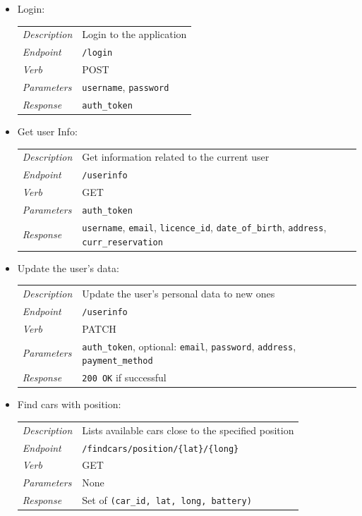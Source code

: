 \documentclass[english]{article}
\newcommand{\code}[1]{\texttt{#1}}
\begin{document}
\begin{itemize}
\begin{itemize}
	\item{Login:}\\
	\begin{tabular}{ | l l }
		\textit{Description} & Login to the application \\
		\textit{Endpoint} & \code{/login} \\ 
		\textit{Verb} & POST \\  
		\textit{Parameters} & \code{username}, \code{password} \\
		\textit{Response} & \code{auth\_token}
	\end{tabular}
	
	\item{Get user Info:}\\
		\begin{tabular}{ | l l }
			\textit{Description} & Get information related to the current user\\
			\textit{Endpoint} & \code{/userinfo} \\ 
			\textit{Verb} & GET \\  
			\textit{Parameters} & \code{auth\_token} \\
			\textit{Response} & \code{username}, \code{email}, \code{licence\_id}, \code{date\_of\_birth},  \code{address}, \code{curr\_reservation}
		\end{tabular}
	
	\item{Update the user's data:}\\
	\begin{tabular}{ | l l }
		\textit{Description} & Update the user's personal data to new ones\\
		\textit{Endpoint} & \code{/userinfo} \\ 
		\textit{Verb} & PATCH \\  
		\textit{Parameters} & \code{auth\_token}, optional: \code{email}, \code{password}, \code{address}, \code{payment\_method}  \\
		\textit{Response} & \code{200 OK} if successful
	\end{tabular}

	\item{Find cars with position:}\\
	\begin{tabular}{ | l l }
		\textit{Description} & Lists available cars close to the specified position\\
		\textit{Endpoint} & \code{/findcars/position/\{lat\}/\{long\}} \\ 
		\textit{Verb} & GET \\  
		\textit{Parameters} & None \\
		\textit{Response} & Set of \code{(car\_id, lat, long, battery)}
	\end{tabular}
	

\end{itemize}
\end{itemize}
\end{document}
